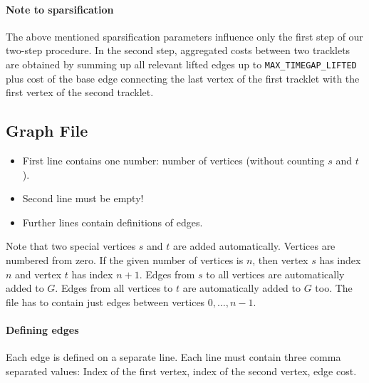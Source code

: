 \documentclass[a4paper,10pt]{article}
\begin{document}
\paragraph{Note to sparsification}
The above mentioned sparsification parameters influence only the first step of our two-step procedure. In the second step, aggregated costs between two tracklets are obtained by summing up all relevant lifted edges up to \texttt{MAX\_TIMEGAP\_LIFTED} plus cost of the base edge connecting the last vertex of the first tracklet with the first vertex of the second tracklet. 




\subsection{Graph File}
\begin{itemize}
	\item First line contains one number: number of vertices (without counting $s$ and $t$).
	\item Second line must be empty!
	\item Further lines contain definitions of edges. 
	
\end{itemize}

Note that two special vertices $s$ and $t$ are added automatically. Vertices are numbered from zero. If the given number of vertices is $n$, then vertex $s$ has index $n$ and vertex $t$ has index $n+1$. Edges from $s$ to all vertices are automatically added to $G$. Edges from all vertices to $t$ are automatically added  to $G$ too. The file has to contain just edges between vertices $0,\dots, n-1$. 

\paragraph{Defining edges }Each edge is defined on a separate line. Each line must contain three comma separated values: Index of the first vertex, index of the second vertex, edge cost.
\end{document}
